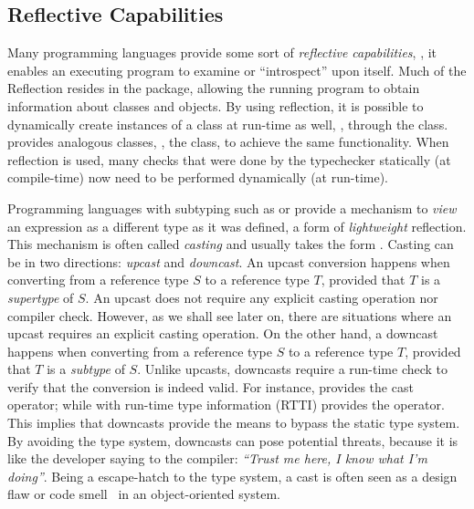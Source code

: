 \subsection*{Reflective Capabilities}

Many programming languages provide some sort of \emph{reflective capabilities},
\ie{}, it enables an executing program to examine or ``introspect'' upon itself.
Much of the \java{} Reflection \api{} resides in the  package,
allowing the running program to obtain information about classes and objects.
By using reflection, it is possible to dynamically create instances of a class at run-time as well, \eg{}, through the  class.
\csharp{} provides analogous classes, \eg{}, the  class,
to achieve the same functionality.
When reflection is used,
many checks that were done by the typechecker statically (at compile-time)
now need to be performed dynamically (at run-time).

Programming languages with subtyping such as \java{} or \cpp{} provide a mechanism to \emph{view} an expression as a different type as it was defined, a form of \emph{lightweight} reflection.
This mechanism is often called \emph{casting} and usually takes the form .
Casting can be in two directions: \emph{upcast} and \emph{downcast}.
An upcast conversion happens when converting from a reference type $S$ to a reference type $T$, provided that $T$ is a \emph{supertype} of $S$.
An upcast does not require any explicit casting operation nor compiler check.
However, as we shall see later on, there are situations where an upcast requires an explicit casting operation.
On the other hand, a downcast happens when converting from a reference type $S$ to a reference type $T$, provided that $T$ is a \emph{subtype} of $S$.
Unlike upcasts,
downcasts require a run-time check to verify that the conversion is indeed valid.
For instance, \java{} provides the cast operator; while
\cpp{} with run-time type information (RTTI) provides the  operator.
This implies that downcasts provide the means to bypass the static type system.
By avoiding the type system, downcasts can pose potential threats, because it is like the developer saying to the compiler: \emph{``Trust me here, I know what I'm doing''}.
Being a escape-hatch to the type system,
a cast is often seen as a design flaw or code smell~\citep{tufanoWhenWhyYour2015} in an object-oriented system.

